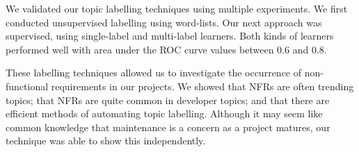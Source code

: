 \documentclass[]{sig-alternate}
\begin{document}

We validated our topic labelling techniques using multiple experiments. 
We first conducted unsupervised labelling using word-lists. 
Our next approach was supervised, using single-label and multi-label learners. 
Both kinds of learners performed well with area under the ROC curve values between $0.6$ and $0.8$.

These labelling techniques allowed us to investigate the occurrence of non-functional requirements in our projects.
We showed that NFRs are often trending topics; that NFRs are quite common in developer topics; and that there are efficient methods of automating topic labelling.
Although it may seem like common knowledge that maintenance is a concern as a project matures, our technique was able to show this independently.

\end{document}
